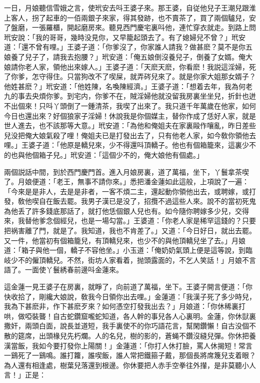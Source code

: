 一日，月娘聽信雪娥之言，使玳安去呌王婆子來。那王婆，自従他兒子王潮兒跟淮上客人，拐了起車的一佰兩銀子來家，得其發跡，也不賣茶了，買了兩個驢兒，安了盤磨，一張羅櫃，開起磨房來。聽見西門慶宅裏呌他，連忙穿衣就走。到路上問玳安說：「我的哥哥，幾時没見你，又早籠起頭去了。有了媳婦兒不曾？」玳安道：「還不曾有哩。」王婆子道：「你爹沒了，你家誰人請我？做甚麽？莫不是你五娘養了兒子了，請我去抱腰？」玳安道：「俺五娘倒沒養兒子，倒養了女婿。俺大娘請你老人家，領他出來嫁人。」王婆子道：「天麽天麽，你看麽！我説這淫婦，死了你爹，怎守得住。只當狗改不了喫屎，就弄硶兒來了。就是你家大姐那女婿子？他姓甚麽？」玳安道：「他姓陳，名喚陳經濟。」王婆子道：「想着去年，我為何老九的事去央煩你爹。到宅内，你爹不在，賊淫婦他就没留我房裏坐坐兒，折針也迸不出個來！只呌丫頭倒了一鍾清茶，我喫了出來了。我只道千年萬歲在他家，如何今日也還出來？好個狼家子淫婦！休說我是你個媒主，替你作成了恁好人家，就是世人進去，也不該那等大意。」玳安道：「為他和俺姐夫在家裏毆作嚷亂，昨日差些兒没把俺大娘氣殺了哩！俺姐夫已是打發出去了，只有他老人家，如今敎你領他去哩。」王婆子道：「他原是轎兒來，少不得還呌頂轎子。他也有個箱籠來，這裏少不的也與他個箱子兒。」玳安道：「這個少不的，俺大娘他有個處。」

兩個説話中間，到於西門慶門首。進入月娘房裏，道了萬福，坐下，丫鬟拿茶喫了。月娘便道：「老王，無事不請你來。」悉把潘金蓮如此這般，上項說了一遍：「今來是是非人，去是是非者，一客不煩二主，還起動你領他出去，或聘嫁，或打發，敎他喫自在飯去罷。我男子漢已是没了，招攬不過這些人來。說不的當初死鬼為他丢了許多錢底那話了，就打他恁個銀人兒也有。如今隨你聘嫁多少兒，交得來，我替他爹念個經兒，也是一場勾當。」王婆道：「你老人家是稀罕這錢的？只要把祸害離了門，就是了。我知道，我也不肯差了。」又道：「今日好日，就出去罷。又一件，他當初有個箱籠兒，有頂轎兒來，也少不的與他頂轎兒坐了去。」月娘道：「箱子與他一個，轎子不容他坐。」小玉道：「俺奶奶氣頭上便是這等說，到臨岐少不的僱頂轎兒。不然，街坊人家看着，抛頭露面的，不乞人笑話！」月娘不言語了。一面使丫鬟綉春前邊呌金蓮來。

這金蓮一見王婆子在房裏，就睜了，向前道了萬福，坐下。王婆子開言便道：「你快收拾了，剛纔大娘說，敎我今日領你出去哩。」金蓮道：「我漢子死了多少時兒，我為下甚麽非，作下甚麽歹來？如何憑空打發我出去？」月娘道：「你休稀裏打哄，做啞裝聾！自古蛇鑽窟嚨蛇知道，各人幹的事兒各人心裏明。金蓮，你休獃裏撒奸，兩頭白面，說長並道短，我手裏使不的你巧語花言，幫閑鑽懶！自古没個不散的筵席，出頭椽兒先朽爛。人的名兒，樹的影的，蒼蝇不鑽沒縫兒彈。你休把養漢當飯，我如今要打發你上陽關！」金蓮道：「你打人休打臉，罵人休揭短！常言一鷄死了一鷄鳴。誰打籮，誰喫飯，誰人常把鐵箍子戴，那個長將席篾兒支着眼？為人還有相逢處，樹葉兒落還到根邊。你休要把人赤手空拳往外攆，是非莫聽小人言！」正是：

